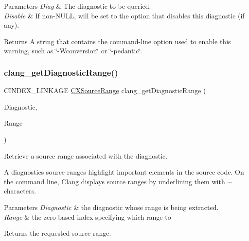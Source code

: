 \begin{DoxyParams}{Parameters}
{\em Diag} & The diagnostic to be queried.\\
\hline
{\em Disable} & If non-\/\+N\+U\+LL, will be set to the option that disables this diagnostic (if any).\\
\hline
\end{DoxyParams}
\begin{DoxyReturn}{Returns}
A string that contains the command-\/line option used to enable this warning, such as \char`\"{}-\/\+Wconversion\char`\"{} or \char`\"{}-\/pedantic\char`\"{}. 
\end{DoxyReturn}
\mbox{\label{group__CINDEX__DIAG_gabd440f1577374289ffebe73d9f65b294}} 
\subsubsection{\texorpdfstring{clang\+\_\+get\+Diagnostic\+Range()}{clang\_getDiagnosticRange()}}
{\footnotesize\ttfamily C\+I\+N\+D\+E\+X\+\_\+\+L\+I\+N\+K\+A\+GE \mbox{\hyperlink{structCXSourceRange}{C\+X\+Source\+Range}} clang\+\_\+get\+Diagnostic\+Range (\begin{DoxyParamCaption}\item[{\mbox{\hyperlink{group__CINDEX__DIAG_ga44bb8aba7c40590ad25d1763c4fbff7f}{C\+X\+Diagnostic}}}]{Diagnostic,  }\item[{unsigned}]{Range }\end{DoxyParamCaption})}



Retrieve a source range associated with the diagnostic. 

A diagnostic\textquotesingle{}s source ranges highlight important elements in the source code. On the command line, Clang displays source ranges by underlining them with \textquotesingle{}$\sim$\textquotesingle{} characters.


\begin{DoxyParams}{Parameters}
{\em Diagnostic} & the diagnostic whose range is being extracted.\\
\hline
{\em Range} & the zero-\/based index specifying which range to\\
\hline
\end{DoxyParams}
\begin{DoxyReturn}{Returns}
the requested source range. 
\end{DoxyReturn}
\mbox{\label{group__CINDEX__DIAG_gaf786e9688b9a685958e486cb81910924}} 
